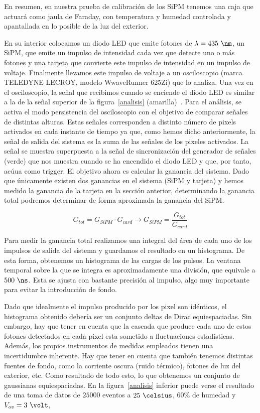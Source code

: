 En resumen, en nuestra prueba de calibración de los SiPM tenemos una caja que actuará como jaula de Faraday, con temperatura y humedad controlada y apantallada en lo posible de la luz del exterior. 

En su interior colocamos un diodo LED que emite fotones de $\lambda=435~\nm$, un SiPM, que emite un impulso de intensidad cada vez que detecte uno o más  fotones  y una tarjeta que convierte este impulso de intensidad en un impulso de voltaje. Finalmente llevamos este impulso de voltaje a un osciloscopio (marca TELEDYNE LECROY, modelo WwaveRunner 625Zi) que lo analiza. 
Una vez en el osciloscopio, la señal que recibimos cuando se enciende el diodo LED es similar a la de la señal superior de la figura~\ref{analisis} (amarilla)~\cite{inftec}. Para el análisis,  se  activa el modo persistencia del osciloscopio con el objetivo de comparar señales de distintas alturas. Estas señales corresponden a distinto número de pixels activados en cada instante de tiempo ya que, como hemos dicho anteriormente, la señal de salida del sistema es la suma de las señales de los pixeles activados. La señal se muestra superpuesta a la señal de sincronización del generador de señales (verde) que nos muestra cuando se ha encendido el diodo LED y que, por tanto, acúua como trigger.
El objetivo ahora es calcular la ganancia del sistema. Dado que únicamente existen dos ganancias en el sistema (SiPM y tarjeta) y hemos medido la ganancia de la tarjeta en la sección anterior, determinando la ganancia total podremos determinar de forma aproximada la ganancia del SiPM. 

\begin{equation}
G_{tot}=G_{SiPM} \cdotp G_{card} \longrightarrow G_{SiPM} = \frac{G_{tot}}{G_{card}}
\label{ganancias}
\end{equation}

Para medir la ganancia total realizamos una integral del área de cada uno de los impulsos de salida del sistema y guardamos el resultado en un histograma. De esta forma, obtenemos un histograma de las cargas de los pulsos. La ventana temporal sobre la que se integra es aproximadamente una división, que equivale a $500~\ns$. Esta se ajusta con bastante precisión al impulso, algo muy importante para evitar la introducción de fondo.

Dado que idealmente el impulso producido por  los pixel son idénticos, el histograma obtenido debería ser  un conjunto deltas de Dirac equiespaciadas. Sin embargo, hay que tener en cuenta que la cascada que produce cada uno de estos fotones detectados en cada pixel esta sometido a fluctuaciones estadísticas. Además, los propios instrumentos de medidas empleados tienen una incertidumbre inherente. Hay que tener en cuenta que también tenemos distintas fuentes de fondo, como la corriente oscura (ruido térmico), fotones de luz del exterior, etc. 
Como resultado de todo esto, lo que obtenemos un conjunto de gaussianas equiespaciadas. En la figura~\ref{analisis} inferior puede verse el resultado de una toma de datos de $25000$ eventos a $25~\celsius$, $60\%$ de humedad y $V_{ov}=3~\volt$,

